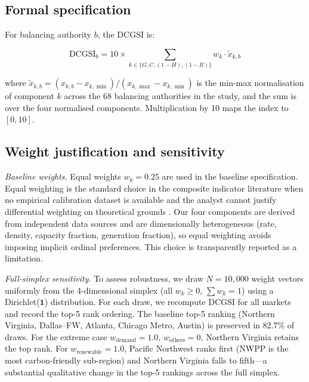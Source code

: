 \documentclass[preprint,12pt]{elsarticle}
\begin{document}
\subsection{Formal specification}
\label{subsec:dcgsi_spec}

For balancing authority $b$, the DCGSI is:

\begin{equation}
\text{DCGSI}_b = 10 \times \sum_{k \in \{G,C,(1{-}H),(1{-}R)\}}
w_k \cdot \tilde{x}_{k,b}
\label{eq:dcgsi}
\end{equation}

\noindent where $\tilde{x}_{k,b} = (x_{k,b} - x_{k,\min}) /
(x_{k,\max} - x_{k,\min})$ is the min-max normalisation of component
$k$ across the 68 balancing authorities in the study, and the sum is
over the four normalised components. Multiplication by 10 maps the index
to $[0, 10]$.

\subsection{Weight justification and sensitivity}
\label{subsec:dcgsi_weights}

\textit{Baseline weights.} Equal weights $w_k = 0.25$ are used in the
baseline specification. Equal weighting is the standard choice in the
composite indicator literature when no empirical calibration dataset is
available and the analyst cannot justify differential weighting on
theoretical grounds \cite{oecd2008handbook}. Our four components are
derived from independent data sources and are dimensionally heterogeneous
(rate, density, capacity fraction, generation fraction), so equal
weighting avoids imposing implicit ordinal preferences. This choice is
transparently reported as a limitation.

\textit{Full-simplex sensitivity.} To assess robustness, we draw
$N=10{,}000$ weight vectors uniformly from the 4-dimensional simplex
(all $w_k \geq 0$, $\sum w_k = 1$) using a Dirichlet($\mathbf{1}$)
distribution. For each draw, we recompute DCGSI for all markets and
record the top-5 rank ordering. The baseline top-5 ranking (Northern
Virginia, Dallas--FW, Atlanta, Chicago Metro, Austin) is preserved in 82.7\%
of draws. For the extreme case $w_{\text{demand}} = 1.0$,
$w_{\text{others}} = 0$, Northern Virginia retains the top rank.
For $w_{\text{renewable}} = 1.0$, Pacific Northwest ranks first (NWPP is the
most carbon-friendly sub-region) and Northern Virginia falls to
fifth---a substantial qualitative change in the top-5 rankings across
the full simplex.
\end{document}
